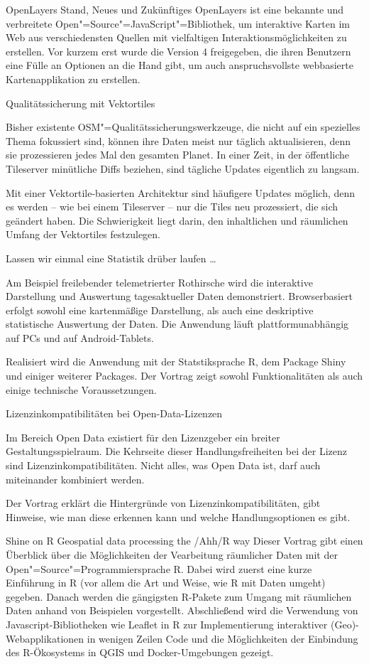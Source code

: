 %
{OpenLayers}%
{Stand, Neues und Zukünftiges}%
{OpenLayers ist eine bekannte und verbreitete
Open"=Source"=JavaScript"=Bibliothek, um interaktive Karten im Web aus
verschiedensten Quellen mit vielfaltigen Interaktionsmöglichkeiten zu
erstellen. Vor kurzem erst wurde die Version 4 freigegeben, die ihren
Benutzern eine Fülle an Optionen an die Hand gibt, um auch
anspruchsvollste webbasierte Kartenapplikation zu erstellen.}

%
{Qualitätssicherung mit Vektortiles}%
{}%
{Bisher existente OSM"=Qualitätssicherungswerkzeuge, die nicht auf ein spezielles Thema fokussiert sind,
  können ihre Daten meist nur täglich aktualisieren, denn sie prozessieren jedes Mal den gesamten
  Planet. In einer Zeit, in der öffentliche Tileserver minütliche Diffs beziehen, sind tägliche
  Updates eigentlich zu langsam.

Mit einer Vektortile-basierten Architektur sind häufigere Updates möglich, denn es werden – wie bei
einem Tileserver – nur die Tiles neu prozessiert, die sich geändert haben. Die Schwierigkeit liegt
darin, den inhaltlichen und räumlichen Umfang der Vektortiles festzulegen.}

%
{Lassen wir einmal eine Statistik \mbox{drüber} laufen \dots}%
{}%
{Am Beispiel freilebender telemetrierter Rothirsche wird die interaktive Darstellung und Auswertung
tagesaktueller Daten demonstriert. Browserbasiert erfolgt sowohl eine kartenmäßige Darstellung,
als auch eine deskriptive statistische Auswertung der Daten.
Die Anwendung läuft plattformunabhängig auf
PCs und auf Android-Tablets.

Realisiert wird die Anwendung mit der Statstiksprache R, dem Package Shiny und einiger weiterer
Packages. Der Vortrag zeigt sowohl Funktionalitäten als auch einige technische Voraussetzungen.}

%
{Lizenzinkompatibilitäten bei Open-Data-Lizenzen}%
{}%
{Im Bereich Open Data existiert für den Lizenzgeber ein breiter Gestaltungsspielraum. Die Kehrseite
  dieser Handlungsfreiheiten bei der Lizenz sind Lizenzinkompatibilitäten. Nicht alles, was Open Data
  ist, darf auch miteinander kombiniert werden.

Der Vortrag erklärt die Hintergründe von Lizenzinkompatibilitäten, gibt Hinweise, wie man diese
erkennen kann und welche Handlungsoptionen es gibt.}

%
{Shine on R}%
{Geospatial data processing the /Ahh/R way}%
{Dieser Vortrag gibt einen Überblick über die Möglichkeiten der Vearbeitung räumlicher Daten mit der
  Open"=Source"=Programmiersprache R. Dabei wird zuerst eine kurze Einführung in R (vor allem die Art
  und Weise, wie R mit Daten umgeht) gegeben. Danach werden die gängigsten R-Pakete zum Umgang mit
  räumlichen Daten anhand von Beispielen vorgestellt. Abschließend wird die Verwendung von
  Javascript-Bibliotheken wie Leaflet in R zur Implementierung interaktiver (Geo)-Webapplikationen
  in wenigen Zeilen Code und die Möglichkeiten der Einbindung des R-Ökosystems in QGIS und
  Docker-Umgebungen gezeigt.}

